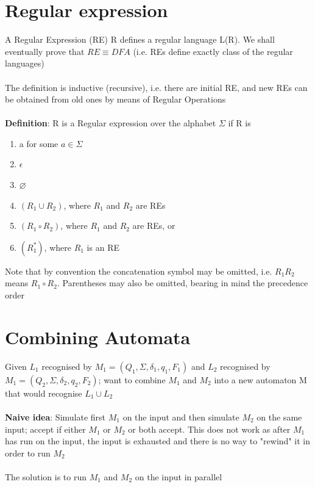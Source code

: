 \documentclass{article}[18pt]
\begin{document}
\section{Regular expression}
A Regular Expression (RE) R defines a regular language L(R). We shall eventually prove that $RE\equiv DFA$ (i.e. REs define exactly class of the regular languages)\\
\\
The definition is inductive (recursive), i.e. there are initial RE, and new REs can be obtained from old ones by means of Regular Operations\\
\\
\textbf{Definition}: R is a Regular expression over the alphabet $\Sigma$ if R is
\begin{enumerate}
	\item a for some $a\in \Sigma$
	\item $\epsilon$
	\item $\varnothing$
	\item $(R_1\cup R_2)$, where $R_1$ and $R_2$ are REs
	\item $(R_1\circ R_2)$, where $R_1$ and $R_2$ are REs, or
	\item $(R_1^*)$, where $R_1$ is an RE
\end{enumerate}
Note that by convention the concatenation symbol may be omitted, i.e. $R_1R_2$ means $R_1\circ R_2$. Parentheses may also be omitted, bearing in mind the precedence order
\section{Combining Automata}
Given $L_1$ recognised by $M_1=(Q_1,\Sigma,\delta_1,q_1,F_1)$ and $L_2$ recognised by $M_1=(Q_2,\Sigma,\delta_2,q_2,F_2)$; want to combine $M_1$ and $M_2$ into a new automaton M that would recognise $L_1\cup L_2$\\
\\
\textbf{Naive idea}: Simulate first $M_1$ on the input and then simulate $M_2$ on the same input; accept if either $M_1$ or $M_2$ or both accept. This does not work as after $M_1$ has run on the input, the input is exhausted and there is no way to "rewind" it in order to run $M_2$\\
\\
The solution is to run $M_1$ and $M_2$ on the input in parallel
\end{document}
